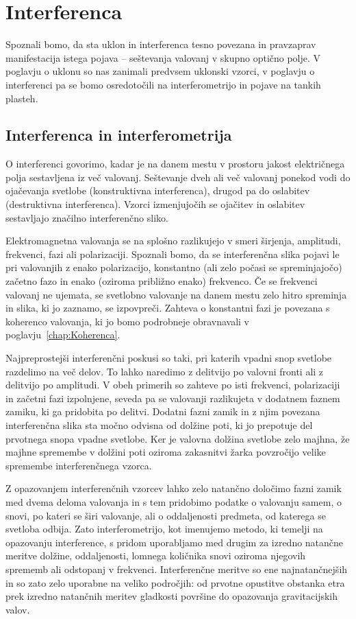 
\chapter{Interferenca}
\label{chap:Interferenca}
Spoznali bomo, da sta uklon in interferenca tesno povezana in pravzaprav
manifestacija istega pojava -- seštevanja  valovanj v 
skupno optično polje. V poglavju o uklonu so nas zanimali predvsem uklonski 
vzorci, v poglavju o interferenci pa se bomo osredotočili na interferometrijo 
in pojave na tankih plasteh.

\section{Interferenca in interferometrija}
O interferenci govorimo, kadar je na danem mestu v 
prostoru jakost električnega polja sestavljena iz 
več valovanj. Seštevanje 
dveh ali več valovanj ponekod vodi
do ojačevanja svetlobe (konstruktivna interferenca), 
drugod pa do oslabitev (destruktivna interferenca). 
Vzorci izmenjujočih se ojačitev in oslabitev sestavljajo
značilno interferenčno sliko.

Elektromagnetna valovanja se na splošno razlikujejo 
v smeri širjenja, amplitudi, frekvenci, fazi ali polarizaciji. 
Spoznali bomo, da se interferenčna slika pojavi le pri valovanjih z enako
polarizacijo, konstantno (ali zelo počasi se spreminjajočo)
začetno fazo in enako (oziroma približno enako) frekvenco. 
Če se frekvenci valovanj ne ujemata, se svetlobno valovanje na 
danem mestu zelo hitro spreminja in slika, ki jo zaznamo, se izpovpreči.
Zahteva o konstantni fazi je povezana s koherenco valovanja, 
ki jo bomo podrobneje obravnavali v poglavju~\ref{chap:Koherenca}. 

Najpreprostejši interferenčni poskusi so taki, pri katerih vpadni snop svetlobe
razdelimo na več delov. To lahko naredimo z delitvijo po valovni fronti
ali z delitvijo po amplitudi. V obeh primerih so zahteve po isti frekvenci, 
polarizaciji in začetni fazi izpolnjene, seveda pa se valovanji razlikujeta 
v dodatnem faznem zamiku, ki ga pridobita po delitvi.
Dodatni fazni zamik in z njim povezana interferenčna slika 
sta močno odvisna od dolžine poti, ki jo prepotuje del prvotnega snopa 
vpadne svetlobe. Ker je valovna dolžina svetlobe zelo majhna, že majhne 
spremembe v dolžini poti oziroma zakasnitvi žarka povzročijo velike spremembe 
interferenčnega vzorca. 

Z opazovanjem interferenčnih vzorcev lahko zelo natančno določimo fazni zamik med
dvema deloma valovanja in s tem pridobimo podatke o valovanju samem, o snovi, po 
kateri se širi valovanje, ali o oddaljenosti predmeta, od katerega se svetloba odbija. 
Zato interferometrijo, kot imenujemo metodo, ki temelji na opazovanju interference,
s pridom uporabljamo med drugim za izredno natančne meritve dolžine, 
oddaljenosti, lomnega količnika snovi oziroma njegovih sprememb ali odstopanj v frekvenci. 
Interferenčne meritve so ene najnatančnejših in so zato zelo uporabne na veliko področjih:
od prvotne opustitve obstanka etra prek izredno natančnih meritev gladkosti površine do
opazovanja gravitacijskih valov. 

